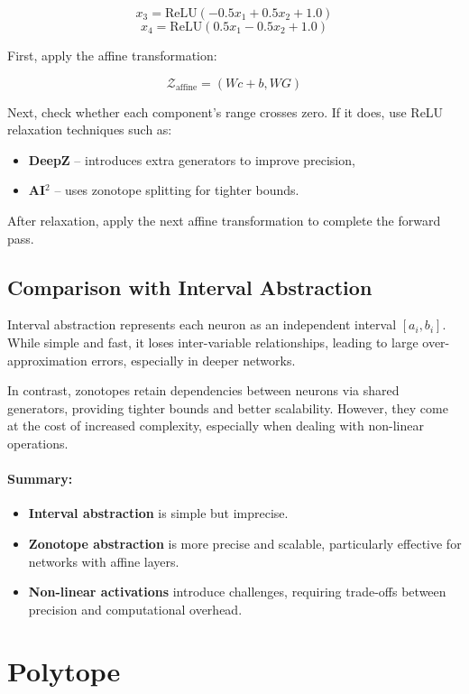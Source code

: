 \documentclass[oneside,11pt,dvipsnames]{book}
\begin{document}
\[
x_3 = \text{ReLU}(-0.5x_1 + 0.5x_2 + 1.0)
\]
\[
x_4 = \text{ReLU}(0.5x_1 - 0.5x_2 + 1.0)
\]

First, apply the affine transformation:

\[
\mathcal{Z}_{\text{affine}} = (Wc + b, WG)
\]

Next, check whether each component's range crosses zero. If it does, use ReLU relaxation techniques such as:

\begin{itemize}
    \item \textbf{DeepZ} – introduces extra generators to improve precision,
    \item \textbf{AI\(^2\)} – uses zonotope splitting for tighter bounds.
\end{itemize}

After relaxation, apply the next affine transformation to complete the forward pass.

\subsection{Comparison with Interval Abstraction}

Interval abstraction represents each neuron as an independent interval \([a_i, b_i]\). While simple and fast, it loses inter-variable relationships, leading to large over-approximation errors, especially in deeper networks.

In contrast, zonotopes retain dependencies between neurons via shared generators, providing tighter bounds and better scalability. However, they come at the cost of increased complexity, especially when dealing with non-linear operations.

\paragraph{Summary:}
\begin{itemize}
    \item \textbf{Interval abstraction} is simple but imprecise.
    \item \textbf{Zonotope abstraction} is more precise and scalable, particularly effective for networks with affine layers.
    \item \textbf{Non-linear activations} introduce challenges, requiring trade-offs between precision and computational overhead.
\end{itemize}



\section{Polytope}
\end{document}
